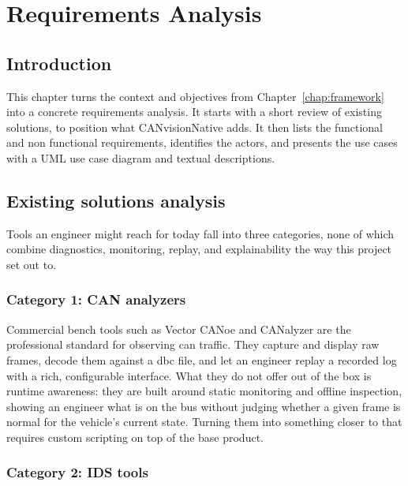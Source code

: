 \chapter{Requirements Analysis}
\label{chap:requirements}

\section{Introduction}

This chapter turns the context and objectives from Chapter~\ref{chap:framework} into a concrete requirements analysis. It starts with a short review of existing solutions, to position what CANvisionNative adds. It then lists the functional and non functional requirements, identifies the actors, and presents the use cases with a UML use case diagram and textual descriptions.

\section{Existing solutions analysis}

Tools an engineer might reach for today fall into three categories, none of which combine diagnostics, monitoring, replay, and explainability the way this project set out to.

\subsection{Category 1: CAN analyzers}

Commercial bench tools such as Vector CANoe and CANalyzer are the professional standard for observing \gls{can} traffic. They capture and display raw frames, decode them against a \gls{dbc} file, and let an engineer replay a recorded log with a rich, configurable interface. What they do not offer out of the box is runtime awareness: they are built around static monitoring and offline inspection, showing an engineer what is on the bus without judging whether a given frame is normal for the vehicle's current state. Turning them into something closer to that requires custom scripting on top of the base product.

\subsection{Category 2: IDS tools}

